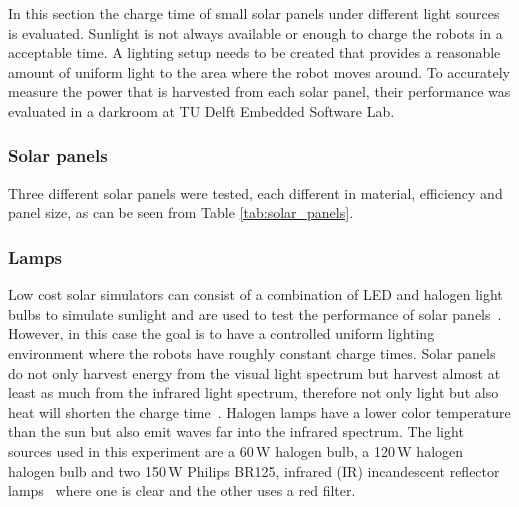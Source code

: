 In this section the charge time of small solar panels under different light sources is evaluated.
Sunlight is not always available or enough to charge the robots in a acceptable time.
A lighting setup needs to be created that provides a reasonable amount of uniform light to the area where the robot moves around.
To accurately measure the power that is harvested from each solar panel, their performance was evaluated in a darkroom at TU Delft Embedded Software Lab.

\subsubsection{Solar panels}
Three different solar panels were tested, each different in material, efficiency and panel size, as can be seen from Table \ref{tab:solar_panels}.

\begin{table}[t]
	\centering
\end{table}

\subsubsection{Lamps}
Low cost solar simulators can consist of a combination of LED and halogen light bulbs to simulate sunlight and are used to test the performance of solar panels~\cite{grandi_tia_2014}.
However, in this case the goal is to have a controlled uniform lighting environment where the robots have roughly constant charge times.
Solar panels do not only harvest energy from the visual light spectrum but harvest almost at least as much from the infrared light spectrum, therefore not only light but also heat will shorten the charge time~\cite{ixolar_slmd121h04l_2017}.
Halogen lamps have a lower color temperature than the sun but also emit waves far into the infrared spectrum.
The light sources used in this experiment are a 60\,W halogen bulb, a 120\,W halogen halogen bulb and two 150\,W Philips  BR125, infrared (IR) incandescent reflector lamps~\cite{philips_irlamp_2017} where one is clear and the other uses a red filter.

